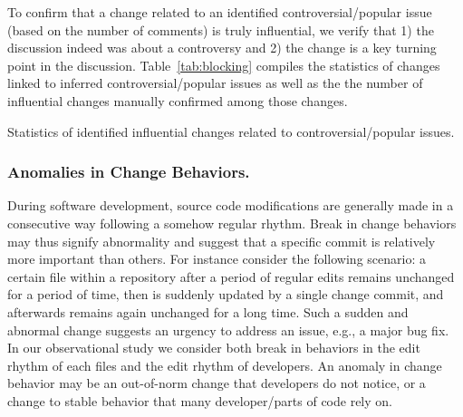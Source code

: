 To confirm that a change related to an identified controversial/popular issue (based on the number of comments) is truly influential,
we verify that 1) the discussion indeed was about a controversy and 2) the change is a key turning point in the discussion.
Table~\ref{tab:blocking}
compiles the statistics of changes linked to inferred controversial/popular issues as well as the
the number of influential changes manually confirmed among those changes.

\begin{table}[h!]
\centering
\caption{Statistics of identified influential changes related to controversial/popular issues.}

\label{tab:blocking}
\end{table}


\subsubsection{Anomalies in Change Behaviors.}
\label{sec:isolated}

During software development, source code modifications
are generally made in a consecutive way following a somehow regular rhythm.
Break in change behaviors may thus signify abnormality and suggest
that a specific commit is relatively more important than others. 
For instance consider the following scenario: a certain file within a repository
after a period of regular edits remains unchanged for a period
of time, then is suddenly updated by a single change commit, and afterwards
remains again unchanged for a long time. Such a sudden and abnormal change 
suggests an urgency to address an issue, e.g., a major bug fix.
In our observational study we consider both break in behaviors in the edit rhythm
of each files and the edit rhythm of developers.
An anomaly in change behavior may be an out-of-norm change that developers do not notice,
 or a change to stable behavior that many developer/parts of code rely on.

